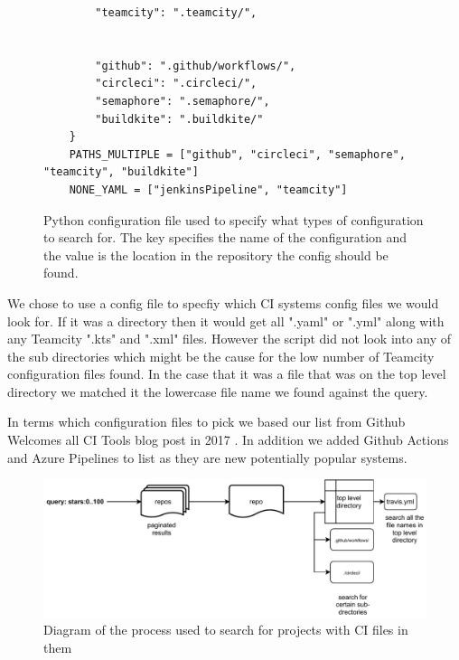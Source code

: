\documentclass[twoside,12pt,titlepage,a4paper]{article}
\begin{document}
\begin{figure}[!htbp]
\begin{minipage}{.48\textwidth}
\begin{verbatim}
        "teamcity": ".teamcity/",
    
    
        "github": ".github/workflows/",
        "circleci": ".circleci/",
        "semaphore": ".semaphore/",
        "buildkite": ".buildkite/"
    }
    PATHS_MULTIPLE = ["github", "circleci", "semaphore", "teamcity", "buildkite"]
    NONE_YAML = ["jenkinsPipeline", "teamcity"]
    \end{verbatim}
    \caption{Python configuration file used to specify what types of configuration to search for. The key specifies the name of the configuration and the value is the location in the repository the config should be found.}
  \end{minipage}
\end{figure}

We chose to use a config file to specfiy which CI systems config files we would look for. If it was a directory then it would get all ".yaml" or ".yml" along with any Teamcity ".kts" and ".xml" files. However the script did not look into any of the sub directories which might be the cause for the low number of Teamcity configuration files found. In the case that it was a file that was on the top level directory we matched it the lowercase file name we found against the query.

In terms which configuration files to pick we based our list from Github Welcomes all CI Tools blog post in 2017 \cite{Github2017}. In addition we added Github Actions and Azure Pipelines to list as they are new potentially popular systems. 

\begin{figure}[h]
  \centering
  \includegraphics[width=\textwidth]{methadology diagram.pdf}
  
  \caption[alt text]{Diagram of the process used to search for projects with CI files in them}
  \label{image_methadolgoy_diagram}
\end{figure}
\end{document}
